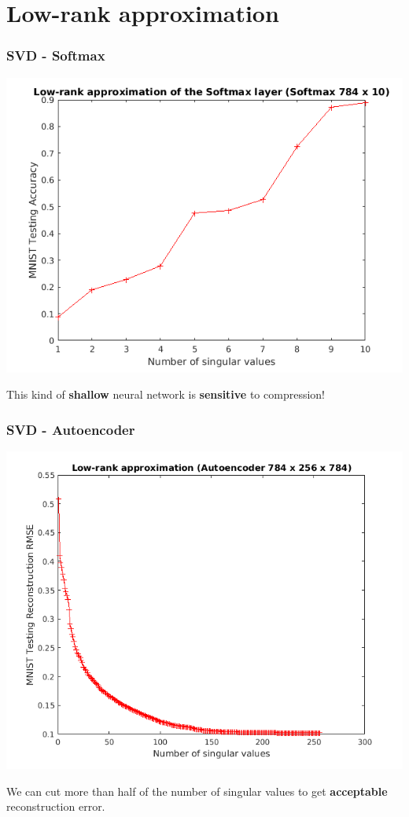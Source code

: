 \documentclass[7pt]{beamer}
\begin{document}
\begin{sloppypar}
\section{Low-rank approximation}


\begin{frame}
\frametitle{SVD - Softmax}
\begin{justify}
\begin{center}
	\includegraphics[scale=0.5]{Low-rank-Softmax}
\end{center}
This kind of \textbf{shallow} neural network is \textbf{sensitive} to compression! 
\end{justify}
\end{frame}


\begin{frame}
\frametitle{SVD - Autoencoder}
\begin{justify}
\begin{center}
	\includegraphics[scale=0.4]{Low-rank-Autoencoder}
\end{center}
We can cut more than half of the number of singular values to get \textbf{acceptable} reconstruction error.
\end{justify}
\end{frame}



\end{sloppypar}
\end{document}
